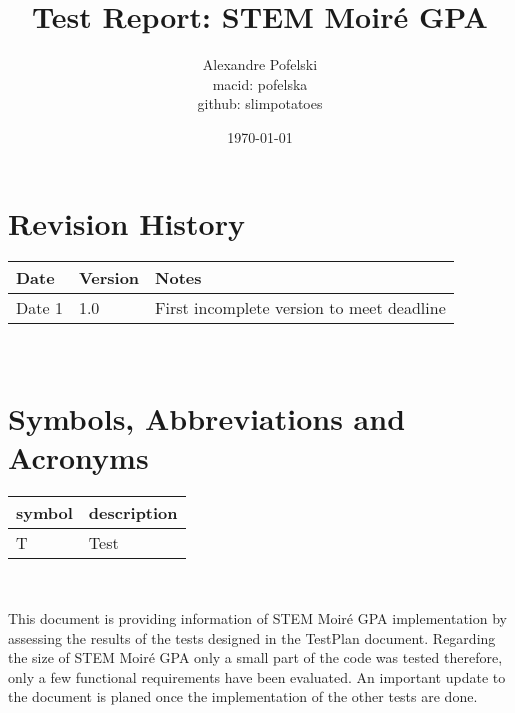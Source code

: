 \documentclass[12pt, titlepage]{article}
\newcommand{\progname}{STEM Moir{\'e} GPA}
\begin{document}
\title{Test Report: STEM Moir{\'e} GPA} 
\author{Alexandre Pofelski \\
		macid: pofelska \\
		github: slimpotatoes}
\date{\today}
	
\maketitle


\section{Revision History}

\begin{tabularx}{\textwidth}{p{3cm}p{2cm}X}
\toprule {\bf Date} & {\bf Version} & {\bf Notes}\\
\midrule
Date 1 & 1.0 & First incomplete version to meet deadline\\
\bottomrule
\end{tabularx}

~\newpage

\section{Symbols, Abbreviations and Acronyms}

\renewcommand{\arraystretch}{1.2}
\begin{tabular}{l l} 
  \toprule		
  \textbf{symbol} & \textbf{description}\\
  \midrule 
  T & Test\\
  \bottomrule
\end{tabular}\\


\newpage

\tableofcontents

\listoftables %

\listoffigures %

\newpage


This document is providing information of \progname{} implementation by assessing the results of the tests designed in the TestPlan document. Regarding the size of \progname{} only a small part of the code was tested therefore, only a few functional requirements have been evaluated. An important update to the document is planed once the implementation of the other tests are done.
\end{document}
